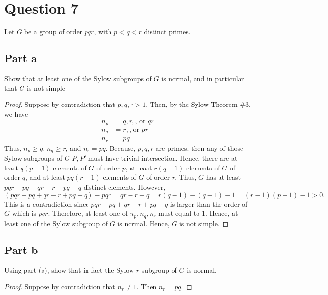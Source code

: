 \section{Question 7}

\begin{question}
    Let $G$ be a group of order $p q r$, with $p<q<r$ distinct primes.
\end{question}

\subsection{Part a}

\begin{question}
    Show that at least one of the Sylow subgroups of $G$ is normal, and in particular that $G$ is not simple.
\end{question}

\begin{answer}
    \begin{proof}
        Suppose by contradiction that $p,q,r > 1$. Then, by the Sylow Theorem \#3, we have
        \begin{equation}
            \begin{aligned}
                n_p &= q,r, \text{, or }qr\\
                n_q &= r, \text{, or } pr\\
                n_r &= pq
            \end{aligned}
        \end{equation}
        Thus, $n_p \geq q$, $n_q \geq r$, and $n_r = pq$. Because, $p,q,r$ are primes. then any of those Sylow subgroups of $G$ $P,P'$ must have trivial intersection. Hence, there are at least $q(p-1)$ elements of $G$ of order $p$, at least $r(q-1)$ elements of $G$ of order $q$, and at least $pq(r-1)$ elements of $G$ of order $r$. Thus, $G$ has at least $pqr - pq + qr - r +pq -q$ distinct elements. However, 
        \begin{equation}
            (pqr - pq + qr - r +pq -q) - pqr = qr - r - q = r(q - 1) - (q - 1) - 1 = (r - 1)(p-1)-1 >0.
        \end{equation}
        This is a contradiction since $pqr - pq + qr - r +pq -q$ is larger than the order of $G$ which is $pqr$. Therefore, at least one of $n_p, n_q, n_r$ must equal to $1$. Hence, at least one of the Sylow subgroup of $G$ is normal. Hence, $G$ is not simple.
    \end{proof}
\end{answer}

\subsection{Part b}

\begin{question}
    Using part (a), show that in fact the Sylow $r$-subgroup of $G$ is normal.
\end{question}

\begin{answer}
    \begin{proof}
        Suppose by contradiction that $n_r \neq 1$. Then $n_r = pq$.
    \end{proof}
\end{answer}